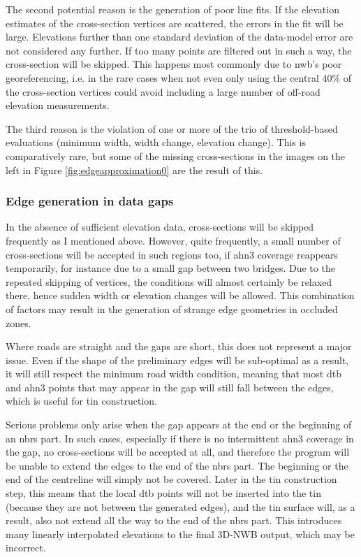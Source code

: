 The second potential reason is the generation of poor line fits. If the elevation estimates of the cross-section vertices are scattered, the errors in the fit will be large. Elevations further than one standard deviation of the data-model error are not considered any further. If too many points are filtered out in such a way, the cross-section will be skipped. This happens most commonly due to \ac{nwb}'s poor georeferencing, i.e. in the rare cases when not even only using the central 40\% of the cross-section vertices could avoid including a large number of off-road elevation measurements.

The third reason is the violation of one or more of the trio of threshold-based evaluations (minimum width, width change, elevation change). This is comparatively rare, but some of the missing cross-sections in the images on the left in Figure \ref{fig:edgeapproximation0} are the result of this.

\subsubsection{Edge generation in data gaps}

In the absence of sufficient elevation data, cross-sections will be skipped frequently as I mentioned above. However, quite frequently, a small number of cross-sections will be accepted in such regions too, if \ac{ahn3} coverage reappears temporarily, for instance due to a small gap between two bridges. Due to the repeated skipping of vertices, the conditions will almost certainly be relaxed there, hence sudden width or elevation changes will be allowed. This combination of factors may result in the generation of strange edge geometries in occluded zones.

Where roads are straight and the gaps are short, this does not represent a major issue. Even if the shape of the preliminary edges will be sub-optimal as a result, it will still respect the minimum road width condition, meaning that most \ac{dtb} and \ac{ahn3} points that may appear in the gap will still fall between the edges, which is useful for \ac{tin} construction.

Serious problems only arise when the gap appears at the end or the beginning of an \ac{nbrs} part. In such cases, especially if there is no intermittent \ac{ahn3} coverage in the gap, no cross-sections will be accepted at all, and therefore the program will be unable to extend the edges to the end of the \ac{nbrs} part. The beginning or the end of the centreline will simply not be covered. Later in the \ac{tin} construction step, this means that the local \ac{dtb} points will not be inserted into the \ac{tin} (because they are not between the generated edges), and the \ac{tin} surface will, as a result, also not extend all the way to the end of the \ac{nbrs} part. This introduces many linearly interpolated elevations to the final 3D-NWB output, which may be incorrect.

